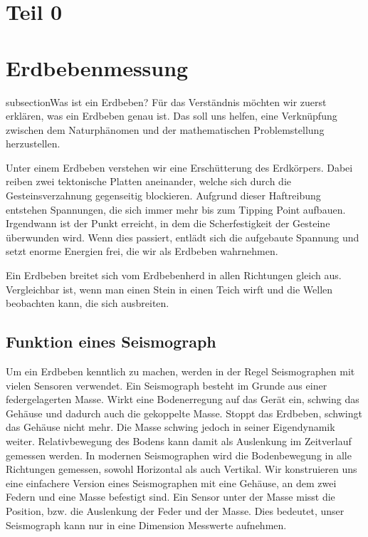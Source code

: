 %
%
\section{Teil 0\label{erdbeben:section:teil0}}
\section{Erdbebenmessung}
subsection{Was ist ein Erdbeben?}
Für das Verständnis möchten wir zuerst erklären, was ein Erdbeben genau ist.
Das soll uns helfen, eine Verknüpfung zwischen dem Naturphänomen und der mathematischen Problemstellung herzustellen.

Unter einem Erdbeben verstehen wir eine Erschütterung des Erdkörpers.
Dabei reiben zwei tektonische Platten aneinander, welche sich durch die Gesteinsverzahnung gegenseitig blockieren.
Aufgrund dieser Haftreibung entstehen Spannungen, die sich immer mehr bis zum Tipping Point aufbauen.
Irgendwann ist der Punkt erreicht, in dem die Scherfestigkeit der Gesteine überwunden wird.
Wenn dies passiert, entlädt sich die aufgebaute Spannung und setzt enorme Energien frei, die wir als Erdbeben wahrnehmen.

Ein Erdbeben breitet sich vom Erdbebenherd in allen Richtungen gleich aus.
Vergleichbar ist, wenn man einen Stein in einen Teich wirft und die Wellen beobachten kann, die sich ausbreiten.

\subsection{Funktion eines Seismograph}
Um ein Erdbeben kenntlich zu machen, werden in der Regel Seismographen mit vielen Sensoren verwendet. 
Ein Seismograph besteht im Grunde aus einer federgelagerten Masse. Wirkt eine Bodenerregung auf das Gerät ein, schwing das Gehäuse und dadurch auch die gekoppelte Masse. 
Stoppt das Erdbeben, schwingt das Gehäuse nicht mehr. 
Die Masse schwing jedoch in seiner Eigendynamik weiter. 
Relativbewegung des Bodens kann damit als Auslenkung im Zeitverlauf gemessen werden.
In modernen Seismographen wird die Bodenbewegung in alle Richtungen gemessen, sowohl Horizontal als auch Vertikal. 
Wir konstruieren uns eine einfachere Version eines Seismographen mit eine Gehäuse, an dem zwei Federn und eine Masse befestigt sind. 
Ein Sensor unter der Masse misst die Position, bzw. die Auslenkung der Feder und der Masse.
Dies bedeutet, unser Seismograph kann nur in eine Dimension Messwerte aufnehmen. 

